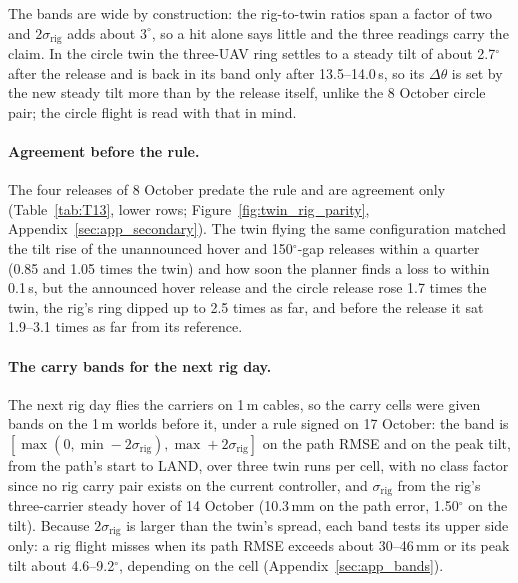 The bands are wide by construction: the rig-to-twin ratios span a factor of two and $2\sigma_{\mathrm{rig}}$
adds about $3^\circ$, so a hit alone says little and the three readings carry the claim. In the circle twin
the three-UAV ring settles to a steady tilt of about 2.7$^\circ$ after the release and is back in its band only
after 13.5--14.0\,s, so its $\Delta\theta$ is set by the new steady tilt more than by the release itself, unlike
the 8 October circle pair; the circle flight is read with that in mind.



\paragraph{Agreement before the rule.} The four releases of 8 October predate the rule and are agreement only
(Table~\ref{tab:T13}, lower rows; Figure~\ref{fig:twin_rig_parity}, Appendix~\ref{sec:app_secondary}). The twin flying the same configuration matched
the tilt rise of the unannounced hover and 150$^\circ$-gap releases within a quarter (0.85 and 1.05 times the twin)
and how soon the planner finds a loss to within 0.1\,s, but the announced hover release and the circle release rose
1.7 times the twin, the rig's ring dipped up to 2.5 times as far, and before the release it sat 1.9--3.1 times as far
from its reference.



\paragraph{The carry bands for the next rig day.} The next rig day flies the carriers on 1\,m cables, so the carry
cells were given bands on the 1\,m worlds before it, under a rule signed on 17 October: the band is
$[\max(0, \min - 2\sigma_{\mathrm{rig}}), \max + 2\sigma_{\mathrm{rig}}]$ on the path RMSE and on the peak tilt, from
the path's start to LAND, over three twin runs per cell, with no class factor since no rig carry pair exists on the
current controller, and $\sigma_{\mathrm{rig}}$ from the rig's three-carrier steady hover of 14 October (10.3\,mm on the
path error, 1.50$^\circ$ on the tilt). Because $2\sigma_{\mathrm{rig}}$ is larger than the twin's spread, each band
tests its upper side only: a rig flight misses when its path RMSE exceeds about 30--46\,mm or its peak tilt about
4.6--9.2$^\circ$, depending on the cell (Appendix~\ref{sec:app_bands}).

